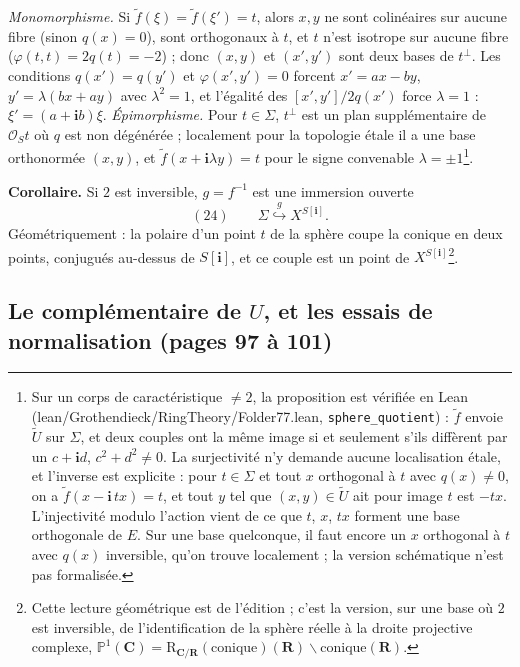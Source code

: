 \documentclass[11pt,a4paper]{article}
\begin{document}
\emph{Monomorphisme.} Si $\tilde{f}(\xi) = \tilde{f}(\xi') = t$, alors $x, y$ ne sont
colinéaires sur aucune fibre (sinon $q(x) = 0$), sont orthogonaux à $t$, et $t$ n'est
isotrope sur aucune fibre ($\varphi(t, t) = 2q(t) = -2$) ; donc $(x, y)$ et $(x', y')$
sont deux bases de $t^{\perp}$. Les conditions $q(x') = q(y')$ et $\varphi(x', y') =
0$ forcent $x' = ax - by$, $y' = \lambda(bx + ay)$ avec $\lambda^2 = 1$, et l'égalité
des $[x', y']/2q(x')$ force $\lambda = 1$ : $\xi' = (a + \mathbf{i}b)\xi$.
\emph{Épimorphisme.} Pour $t \in \Sigma$, $t^{\perp}$ est un plan supplémentaire de
$\mathcal{O}_S t$ où $q$ est non dégénérée ; localement pour la topologie étale il a une
base orthonormée $(x, y)$, et $\tilde{f}(x + \mathbf{i}\lambda y) = t$ pour le signe
convenable $\lambda = \pm 1$\footnote{Sur un corps de caractéristique $\neq 2$,
la proposition est vérifiée en Lean (lean/Grothendieck/RingTheory/Folder77.lean,
\texttt{sphere\_quotient}) : $\tilde{f}$ envoie $\tilde{U}$ sur $\Sigma$, et deux
couples ont la même image si et seulement s'ils diffèrent par un $c + \mathbf{i}d$,
$c^2 + d^2 \neq 0$. La surjectivité n'y demande aucune localisation étale, et
l'inverse est explicite : pour $t \in \Sigma$ et tout $x$ orthogonal à $t$ avec
$q(x) \neq 0$, on a $\tilde{f}(x - \mathbf{i}\,tx) = t$, et tout $y$ tel que
$(x, y) \in \tilde{U}$ ait pour image $t$ est $-tx$. L'injectivité modulo
l'action vient de ce que $t$, $x$, $tx$ forment une base orthogonale de $E$.
Sur une base quelconque, il faut encore un $x$ orthogonal à $t$ avec $q(x)$
inversible, qu'on trouve localement ; la version schématique n'est pas
formalisée.}.

\textbf{Corollaire.} Si $2$ est inversible, $g = f^{-1}$ est une immersion ouverte
\[
  (24) \qquad \Sigma \overset{g}{\hookrightarrow} X^{S[\mathbf{i}]} .
\]
Géométriquement : la polaire d'un point $t$ de la sphère coupe la conique en deux
points, conjugués au-dessus de $S[\mathbf{i}]$, et ce couple est un point de
$X^{S[\mathbf{i}]}$\footnote{Cette lecture géométrique est de l'édition ; c'est la
version, sur une base où $2$ est inversible, de l'identification de la sphère réelle
à la droite projective complexe, $\mathbb{P}^1(\mathbf{C}) = \mathrm{R}_{\mathbf{C}/\mathbf{R}}
(\text{conique})(\mathbf{R}) \smallsetminus \text{conique}(\mathbf{R})$.}.

\subsection*{Le complémentaire de $U$, et les essais de normalisation (pages 97 à 101)}
\end{document}
